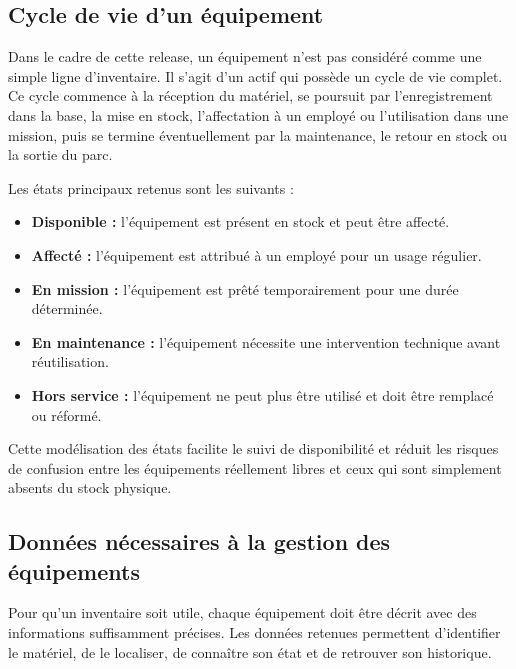 \subsection{Cycle de vie d'un équipement}

Dans le cadre de cette release, un équipement n'est pas considéré comme une simple ligne d'inventaire. Il s'agit d'un actif qui possède un cycle de vie complet. Ce cycle commence à la réception du matériel, se poursuit par l'enregistrement dans la base, la mise en stock, l'affectation à un employé ou l'utilisation dans une mission, puis se termine éventuellement par la maintenance, le retour en stock ou la sortie du parc.

Les états principaux retenus sont les suivants :

\begin{itemize}[label=\textbullet,font=\normalsize]
    \item \textbf{Disponible :} l'équipement est présent en stock et peut être affecté.
    \item \textbf{Affecté :} l'équipement est attribué à un employé pour un usage régulier.
    \item \textbf{En mission :} l'équipement est prêté temporairement pour une durée déterminée.
    \item \textbf{En maintenance :} l'équipement nécessite une intervention technique avant réutilisation.
    \item \textbf{Hors service :} l'équipement ne peut plus être utilisé et doit être remplacé ou réformé.
\end{itemize}

Cette modélisation des états facilite le suivi de disponibilité et réduit les risques de confusion entre les équipements réellement libres et ceux qui sont simplement absents du stock physique.

\subsection{Données nécessaires à la gestion des équipements}

Pour qu'un inventaire soit utile, chaque équipement doit être décrit avec des informations suffisamment précises. Les données retenues permettent d'identifier le matériel, de le localiser, de connaître son état et de retrouver son historique.

